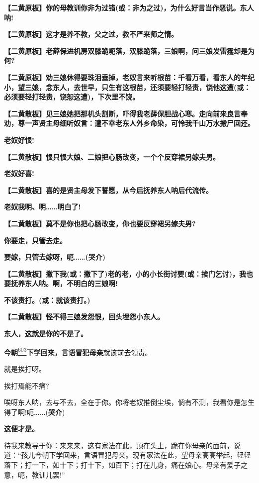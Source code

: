 \textbf{【二黄原板】你的母教训你非为过错(或：非为之过)，为什么好言当作恶说。东人呐!}

\textbf{【二黄原板】这才是养不教，父之过，教不严来师之惰。}

\textbf{【二黄原板】老薛保进机房双膝跪呃落，双膝跪落，三娘啊，问三娘发雷霆却是为何?}

\textbf{【二黄原板】劝三娘休得要珠泪垂掉，老奴言来听根苗：千看万看，看东人的年纪小，望三娘，念东人，去世早，只生有这根苗，还须要轻打轻责，饶他这遭(或：必须要轻打轻责，饶恕这遭)，下次里不饶。}

\textbf{【二黄散板】见三娘她把那机头割断，吓得我老薛保胆战心寒。走向前来良言奉劝，尊一声贤主母细听奴言：遭不幸老东人外乡命染，可怜我千山万水搬尸回还。}

\textbf{老奴好恨!}

\textbf{【二黄散板】恨只恨大娘、二娘把心肠改变，一个个反穿裙另嫁夫男。}

\textbf{老奴好喜!}

\textbf{【二黄散板】喜的是贤主母发下誓愿，从今后抚养东人呐后代流传。}

\textbf{老奴我明、明\ldots{}\ldots{}明白了!}

\textbf{【二黄散板】莫不是你也把心肠改变，你也要反穿裙另嫁夫男?}

\textbf{你要走，只管去走。}

\textbf{要嫁，只管去嫁呀，呃\ldots{}\ldots{}(哭介)}

\textbf{【二黄散板】撇下我(或：撇下了)老的老，小的小长街讨要(或：挨门乞讨)，我也要抚养东人呐。啊，不明白的三娘啊!}

\textbf{不该责打。(或：就该责打。)}

\textbf{【二黄散板】怪不得三娘发怨恨，回头埋怨小东人。}

\textbf{东人，这就是你的不是了。}

\textbf{今朝}\protect\hyperlink{fn603}{\textsuperscript{603}}\textbf{下学回来，言语冒犯母亲}就该前去领责。

就是挨打呀。

挨打焉能不痛?

唉呀东人呐，去与不去，全在于你。你将老奴推倒尘埃，倘有不测，我看你是怎生得了啊!呃\textbf{\ldots{}\ldots{}}(\textbf{哭介})

\textbf{这便才是。}

待我来教导于你：来来来，这有家法在此，顶在头上，跪在你母亲的面前，说道：``孩儿今朝下学回来，言语冒犯母亲。现有家法在此，望母亲高高举起，轻轻落下；打一下，如十下；打十下，如百下；打在儿身，痛在娘心。母亲有爱子之意，呃，教训儿罢!''

